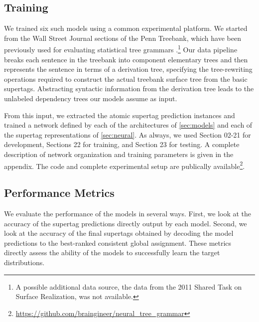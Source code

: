 \documentclass[11pt]{article}
\begin{document}
\subsection{Training}

We trained six such models using a common experimental platform.  We
started from the Wall Street Journal sections of the Penn Treebank,
which have been previously used for evaluating statistical tree
grammars \cite{chiang2000statistical}.\footnote{A possible additional
  data source, the data from the 2011 Shared Task on Surface
  Realization, was not available.}
%
Our data pipeline breaks each sentence in the treebank into component
elementary trees and then represents the sentence in terms of a
derivation tree, specifying the tree-rewriting operations required to
construct the actual treebank surface tree from the basic supertags.
%
Abstracting syntactic information from the derivation tree leads to
the unlabeled dependency trees our models assume as input.

From this input, we extracted the atomic supertag prediction instances
and trained a network defined by each of the architectures of
\ref{sec:models} and each of the supertag representations of
\ref{sec:neural}.  As always, we used Section 02-21 for development,
Sections 22 for training, and Section 23 for testing.  A complete
description of network organization and training parameters is given
in the appendix.  The code and complete experimental setup are publically available\footnote{\url{https://github.com/braingineer/neural_tree_grammar}}.

\subsection{Performance Metrics}


We evaluate the performance of the models in several ways.  First, we
look at the accuracy of the supertag predictions directly output by
each model.  Second, we look at the accuracy of the final supertags
obtained by decoding the model predictions to the best-ranked
consistent global assignment.  These metrics directly assess the
ability of the models to successfully learn the target distributions.
\end{document}
